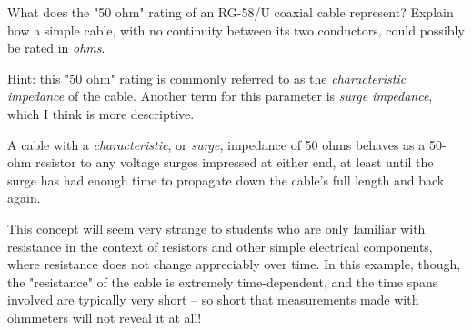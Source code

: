

What does the "50 ohm" rating of an RG-58/U coaxial cable represent?  Explain how a simple cable, with no continuity between its two conductors, could possibly be rated in {\it ohms}.

Hint: this "50 ohm" rating is commonly referred to as the {\it characteristic impedance} of the cable.  Another term for this parameter is {\it surge impedance}, which I think is more descriptive.







A cable with a {\it characteristic}, or {\it surge}, impedance of 50 ohms behaves as a 50-ohm resistor to any voltage surges impressed at either end, at least until the surge has had enough time to propagate down the cable's full length and back again.







This concept will seem very strange to students who are only familiar with resistance in the context of resistors and other simple electrical components, where resistance does not change appreciably over time.  In this example, though, the "resistance" of the cable is extremely time-dependent, and the time spans involved are typically very short -- so short that measurements made with ohmmeters will not reveal it at all!





